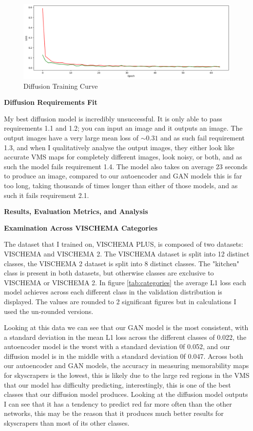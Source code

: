 \documentclass{UoYCSproject}
\begin{document}
\begin{figure}[ht]
    \centering
    \includegraphics[width=\linewidth]{Diffusion training curve}
    \caption{Diffusion Training Curve}
    \label{fig:DiffusionTraining}
\end{figure}

\textbf{Diffusion Requirements Fit}

My best diffusion model is incredibly unsuccessful. It is only able to pass requirements 1.1 and 1.2; you can input an image and it outputs an image. The output images have a very large mean loss of \( \sim 0.31 \) and as such fail requirement 1.3, and when I qualitatively analyse the output images, they either look like accurate VMS maps for completely different images, look noisy, or both, and as such the model fails requirement 1.4. The model also takes on average 23 seconds to produce an image, compared to our autoencoder and GAN models this is far too long, taking thousands of times longer than either of those models, and as such it fails requirement 2.1. 

\textbf{Results, Evaluation Metrics, and Analysis}

\textbf{Examination Across VISCHEMA Categories}

The dataset that I trained on, VISCHEMA PLUS, is composed of two datasets: VISCHEMA and VISCHEMA 2. The VISCHEMA dataset is split into 12 distinct classes, the VISCHEMA 2 dataset is split into 8 distinct classes. The "kitchen" class is present in both datasets, but otherwise classes are exclusive to VISCHEMA or VISCHEMA 2. In figure \ref{tab:categories} the average L1 loss each model achieves across each different class in the validation distribution is displayed. The values are rounded to 2 significant figures but in calculations I used the un-rounded versions. 

Looking at this data we can see that our GAN model is the most consistent, with a standard deviation in the mean L1 loss across the different classes of 0.022, the autoencoder model is the worst with a standard deviation 0f 0.052, and our diffusion model is in the middle with a standard deviation 0f 0.047. Across both our autoencoder and GAN models, the accuracy in measuring memorability maps for skyscrapers is the lowest, this is likely due to the large red regions in the VMS that our model has difficulty predicting, interestingly, this is one of the best classes that our diffusion model produces. Looking at the diffusion model outputs I can see that it has a tendency to predict red far more often than the other networks, this may be the reason that it produces much better results for skyscrapers than most of its other classes.  
\end{document}
